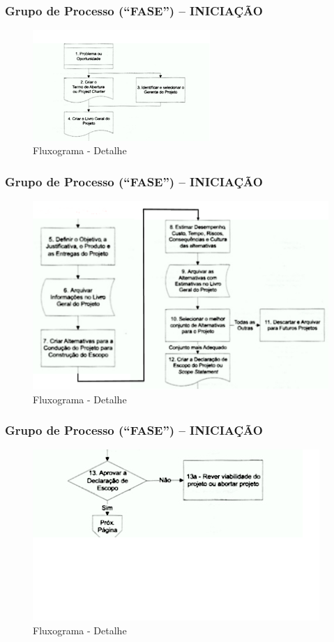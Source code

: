  \begin{frame}
   \frametitle{Grupo de Processo (“FASE”) – INICIAÇÃO}
    \begin{figure}
  \centering
  \includegraphics[width = 0.6\textwidth]{figs/fig1_9.png}
  \caption{Fluxograma - Detalhe}
 \end{figure}
  \end{frame}


\begin{frame}
   \frametitle{Grupo de Processo (“FASE”) – INICIAÇÃO}
   \begin{figure}
  \centering
  \includegraphics[height = 0.8\textheight]{figs/fig1_16.png}
  \caption{Fluxograma - Detalhe}
 \end{figure}
\end{frame}

\begin{frame}
   \frametitle{Grupo de Processo (“FASE”) – INICIAÇÃO}
   \begin{figure}
  \centering
  \includegraphics[height = 0.7\textheight]{figs/fig1_15.png}
  \caption{Fluxograma - Detalhe}
 \end{figure}
\end{frame}





